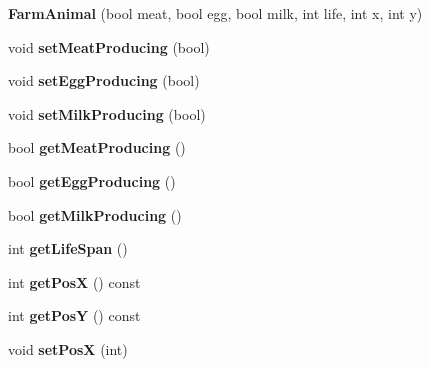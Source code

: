 \begin{DoxyCompactItemize}
\item 
\mbox{\label{class_farm_animal_ad45a3093f80ad488e078d5265b0bbdcf}} 
{\bfseries Farm\+Animal} (bool meat, bool egg, bool milk, int life, int x, int y)
\item 
\mbox{\label{class_farm_animal_acf5e002222c91fc0e735d22021f9c25d}} 
void {\bfseries set\+Meat\+Producing} (bool)
\item 
\mbox{\label{class_farm_animal_a41eb5889b024e6b4b6b34b3d26d1d655}} 
void {\bfseries set\+Egg\+Producing} (bool)
\item 
\mbox{\label{class_farm_animal_a0505a603f5d66438e24aa5edb7c58d2c}} 
void {\bfseries set\+Milk\+Producing} (bool)
\item 
\mbox{\label{class_farm_animal_a9c34ee38fe16b9d5ed68ceaf7bc46910}} 
bool {\bfseries get\+Meat\+Producing} ()
\item 
\mbox{\label{class_farm_animal_a15bce6561b72404291e8d25f11f6ed86}} 
bool {\bfseries get\+Egg\+Producing} ()
\item 
\mbox{\label{class_farm_animal_a779a8b34eec5df21ccf2e12a95e626b1}} 
bool {\bfseries get\+Milk\+Producing} ()
\item 
\mbox{\label{class_farm_animal_a5481b182a18d6ca3beb54a041c97b650}} 
int {\bfseries get\+Life\+Span} ()
\item 
\mbox{\label{class_farm_animal_a7ac2e4bc2866d34ecc90d6b55c9f241d}} 
int {\bfseries get\+PosX} () const
\item 
\mbox{\label{class_farm_animal_aed372508003c3458067758a2a0a090aa}} 
int {\bfseries get\+PosY} () const
\item 
\mbox{\label{class_farm_animal_aa94faebfc5441943e48fe2caca6d5749}} 
void {\bfseries set\+PosX} (int)
\item 
\mbox{\label{class_farm_animal_aac8d44231fef56667172cab7aec28b4c}} 

\end{DoxyCompactItemize}

